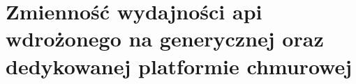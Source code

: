 \section{Zmienność wydajności api wdrożonego na generycznej oraz dedykowanej platformie chmurowej}


